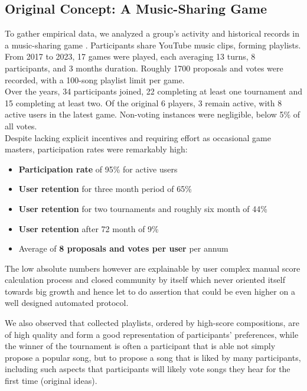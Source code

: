 \documentclass{article}
\begin{document}
\begin{CJK}{UTF8}{gbsn}
\begin{multicols}{2}
        \subsection{Original Concept: A Music-Sharing Game}
        To gather empirical data, we analyzed a group's activity and historical records in a music-sharing game \cite{DariusYoutube}. Participants share YouTube music clips, forming playlists. From 2017 to 2023, 17 games were played, each averaging 13 turns, 8 participants, and 3 months duration. Roughly 1700 proposals and votes were recorded, with a 100-song playlist limit per game.\\
        Over the years, 34 participants joined, 22 completing at least one tournament and 15 completing at least two. Of the original 6 players, 3 remain active, with 8 active users in the latest game. Non-voting instances were negligible, below 5\% of all votes. \\
        Despite lacking explicit incentives and requiring effort as occasional game masters, participation rates were remarkably high:
        \begin{itemize}[nosep]
            \item \textbf{Participation rate} of 95\% for active users
            \item \textbf{User retention} for three month period of 65\%
            \item \textbf{User retention} for two tournaments and roughly six month of 44\%
            \item \textbf{User retention} after 72 month of 9\%
            \item Average of \textbf{8 proposals and votes per user} per annum
        \end{itemize}

        The low absolute numbers however are explainable by user complex manual score calculation process and closed community by itself which never oriented itself towards big growth and hence let to do assertion that could be even higher on a well designed automated protocol.

        We also observed that collected playlists, ordered by high-score compositions, are of high quality and form a good representation of participants' preferences, while the winner of the tournament is often a participant that is able not simply propose a popular song, but to propose a song that is liked by many participants, including such aspects that participants will likely vote songs they hear for the first time (original ideas).


\end{multicols}
\end{CJK}
\end{document}
